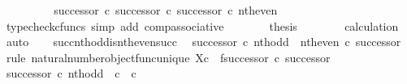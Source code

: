 \begin{isabellebody}
\ \ \ \ \isamarkupfalse%
\ \isamarkupfalse%
\ {\isachardoublequoteopen}{\isachardot}{\kern0pt}{\isachardot}{\kern0pt}{\isachardot}{\kern0pt}\ {\isacharequal}{\kern0pt}\ {\isacharparenleft}{\kern0pt}successor\ {\isasymcirc}\isactrlsub c\ successor{\isacharparenright}{\kern0pt}\ {\isasymcirc}\isactrlsub c\ successor\ {\isasymcirc}\isactrlsub c\ nth{\isacharunderscore}{\kern0pt}even{\isachardoublequoteclose}\isanewline
\ \ \ \ \ \ \isamarkupfalse%
\ {\isacharparenleft}{\kern0pt}typecheck{\isacharunderscore}{\kern0pt}cfuncs{\isacharcomma}{\kern0pt}\ simp\ add{\isacharcolon}{\kern0pt}\ comp{\isacharunderscore}{\kern0pt}associative{}{\isacharparenright}{\kern0pt}\isanewline
\ \ \ \ \isamarkupfalse%
\ \isamarkupfalse%
\ {\isacharquery}{\kern0pt}thesis\isanewline
\ \ \ \ \ \ \isamarkupfalse%
\ calculation\ \isamarkupfalse%
\ auto\isanewline
\ \ \isamarkupfalse%
\isanewline
{}\isamarkupfalse%
%
\endisatagproof
{\isafoldproof}%
%
\isadelimproof
\isanewline
%
\endisadelimproof
\isanewline
{}\isamarkupfalse%
\ succ{\isacharunderscore}{\kern0pt}nth{\isacharunderscore}{\kern0pt}odd{\isacharunderscore}{\kern0pt}is{\isacharunderscore}{\kern0pt}nth{\isacharunderscore}{\kern0pt}even{\isacharunderscore}{\kern0pt}succ{\isacharcolon}{\kern0pt}\isanewline
\ \ {\isachardoublequoteopen}successor\ {\isasymcirc}\isactrlsub c\ nth{\isacharunderscore}{\kern0pt}odd\ {\isacharequal}{\kern0pt}\ nth{\isacharunderscore}{\kern0pt}even\ {\isasymcirc}\isactrlsub c\ successor{\isachardoublequoteclose}\isanewline
%
\isadelimproof
%
\endisadelimproof
%
\isatagproof
{}\isamarkupfalse%
\ {\isacharparenleft}{\kern0pt}rule\ natural{\isacharunderscore}{\kern0pt}number{\isacharunderscore}{\kern0pt}object{\isacharunderscore}{\kern0pt}func{\isacharunderscore}{\kern0pt}unique{\isacharbrackleft}{\kern0pt}\ X{\isacharequal}{\kern0pt}{\isachardoublequoteopen}{\isasymnat}\isactrlsub c{\isachardoublequoteclose}{\isacharcomma}{\kern0pt}\ \ f{\isacharequal}{\kern0pt}{\isachardoublequoteopen}successor\ {\isasymcirc}\isactrlsub c\ successor{\isachardoublequoteclose}{\isacharbrackright}{\kern0pt}{\isacharparenright}{\kern0pt}\isanewline
\ \ \isamarkupfalse%
\ {\isachardoublequoteopen}successor\ {\isasymcirc}\isactrlsub c\ nth{\isacharunderscore}{\kern0pt}odd\ {\isacharcolon}{\kern0pt}\ {\isasymnat}\isactrlsub c\ {\isasymrightarrow}\ {\isasymnat}\isactrlsub c{\isachardoublequoteclose}\isanewline

\end{isabellebody}

